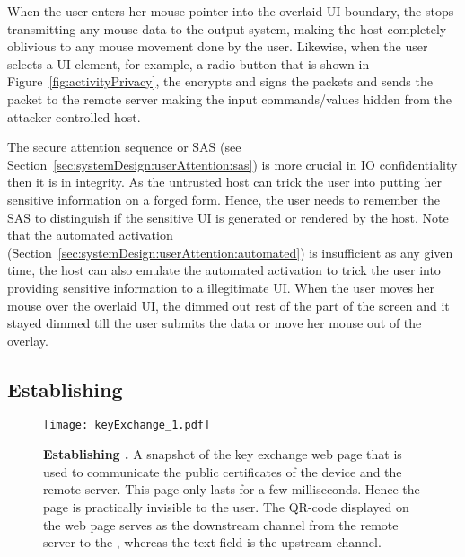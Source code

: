  When the user enters her mouse pointer into the overlaid UI boundary, the \device stops transmitting any mouse data to the output system, making the host completely oblivious to any mouse movement done by the user. Likewise, when the user selects a UI element, for example, a radio button that is shown in Figure~\ref{fig:activityPrivacy}, the \device encrypts and signs the packets and sends the packet to the remote server making the input commands/values hidden from the attacker-controlled host.

 The secure attention sequence or SAS (see Section~\ref{sec:systemDesign:userAttention:sas}) is more crucial in IO confidentiality then it is in integrity. As the untrusted host can trick the user into putting her sensitive information on a forged form. Hence, the user needs to remember the SAS to distinguish if the sensitive UI is \device generated or rendered by the host. Note that the automated activation (Section~\ref{sec:systemDesign:userAttention:automated}) is insufficient as any given time, the host can also emulate the automated activation to trick the user into providing sensitive information to a illegitimate UI. When the user moves her mouse over the overlaid UI, the \device dimmed out rest of the part of the screen and it stayed dimmed till the user submits the data or move her mouse out of the overlay.


\subsection{Establishing \tls}
\label{sec:confidentiality:tls}

\begin{figure}[t]
\centering
\texttt{[image: keyExchange\_1.pdf]}
\caption{\textbf{Establishing \tls.} A snapshot of the key exchange web page that is used to communicate the public certificates of the device and the remote server. This page only lasts for a few milliseconds. Hence the page is practically invisible to the user. The QR-code displayed on the web page serves as the downstream channel from the remote server to the \device, whereas the text field is the upstream channel.}
\spacesave
\label{fig:keyExchange}
\centering
\end{figure} 

